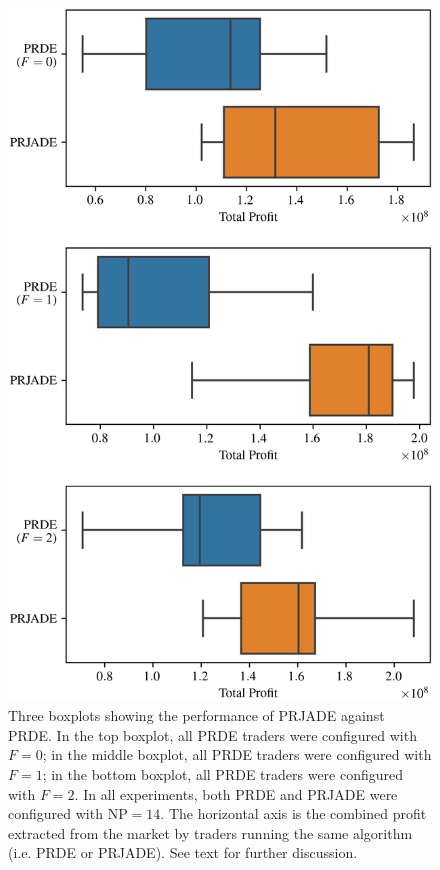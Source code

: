 \documentclass[a4paper,twoside]{article}
\begin{document}
\begin{figure}[htbp]
    \centerline{\includegraphics[width=\columnwidth]{prjade_prde_boxplot.png}}
    \caption{
        Three boxplots showing the performance of PRJADE against PRDE.
        In the top boxplot, all PRDE traders were configured with $F=0$; in the middle boxplot, all PRDE traders were configured with $F=1$; in the bottom boxplot, all PRDE traders were configured with $F=2$.
        In all experiments, both PRDE and PRJADE were configured with $\mathrm{NP}=14$.
        The horizontal axis is the combined profit extracted from the market by traders running the same algorithm (i.e. PRDE or PRJADE).
        See text for further discussion.
    }
    \label{prjade_prde_boxplot}
\end{figure}
\end{document}

